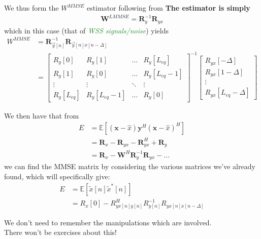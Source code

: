 \documentclass[a4paper, 12pt]{book}
\begin{document}
We thus form the $W^{MMSE}$ estimator following from
\textbf{The estimator is simply}
\begin{align}
    \mathbf{W}^{LMMSE} = \mathbf{R}_y^{-1} \mathbf{R}_{yx} \label{eq:1.224}
\end{align}
which in this case (that of \textit{\textcolor{ForestGreen}{WSS signals/noise}}) yields
\begin{align}
    W^{MMSE} &= \mathbf{R}_{\vec{y}[n]}^{-1} \mathbf{R}_{\vec{y}[n]x[n-\Delta]} \label{eq:3.102} \\
    &= \begin{bmatrix}
        R_y[0] & R_y[1] & \dots & R_y[L_{eq}] \\
        R_y[1] & R_y[0] & \dots & R_y[L_{eq}-1] \\
        \vdots & \vdots & \ddots & \vdots \\
        R_y[L_{eq}] & R_y[L_{eq}-1] & \dots & R_y[0]
    \end{bmatrix}^{-1}
    \begin{bmatrix}
        R_{yx}[-\Delta] \\
        R_{yx}[1-\Delta] \\
        \vdots \\
        R_{yx}[L_{eq}-\Delta]
    \end{bmatrix} \label{eq:2.163}
\end{align}

We then have that from
\begin{align}
    E &= \mathbb{E}[(\mathbf{x}-\hat{x})\mathbf{y}^H(\mathbf{x}-\hat{x})^H] \label{eq:1.241} \\
    &= \mathbf{R}_x - \mathbf{R}_{yx} - \mathbf{R}_{yx}^H + \mathbf{R}_y \label{eq:1.242} \\
    &= \mathbf{R}_x - \mathbf{W}^H \mathbf{R}_y^{-1} \mathbf{R}_{yx} - \dots \label{eq:1.243}
\end{align}
we can find the MMSE matrix by considering the various matrices we've already found, which will specifically give:
\begin{align}
    E &= \mathbb{E}[\tilde{x}[n]\tilde{x}^*[n]] \label{eq:2.164} \\
    &= R_x[0] - R_{yx[n]y[n]}^H R_{y[n]}^{-1} R_{yx[n]x[n-\Delta]} \label{eq:2.165}
\end{align}

\begin{tcolorbox}[colback=teal!5, colframe=teal, boxrule=0.5pt, sharp corners]
    We don't need to remember the manipulations which are involved.\\
    There won't be exercises about this!
\end{tcolorbox}
\end{document}
